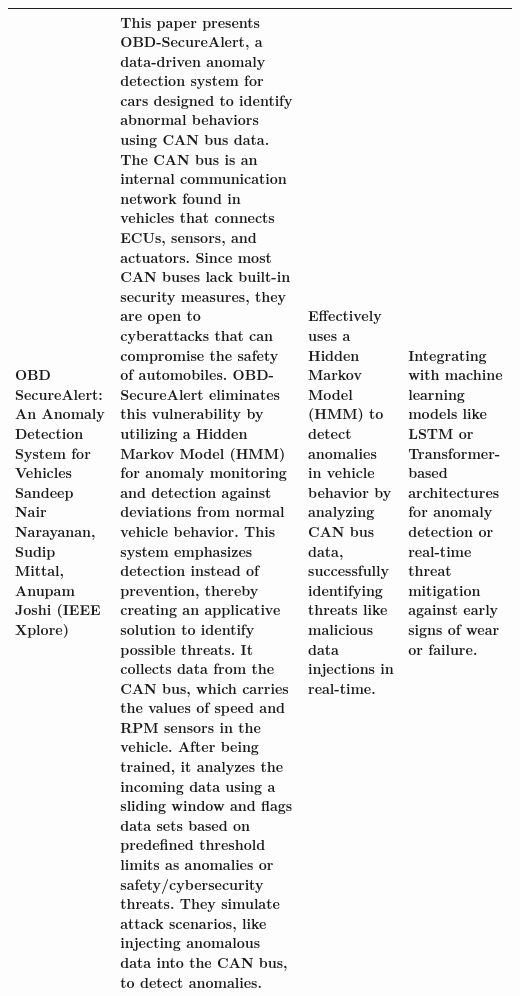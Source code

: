 \begin{longtable}{|p{}|p{}|p{}|p{}|}
OBD SecureAlert: An Anomaly Detection System for Vehicles
\newline
Sandeep Nair Narayanan, Sudip Mittal, Anupam Joshi
\newline
(IEEE Xplore) &
This paper presents OBD-SecureAlert, a data-driven anomaly detection system for cars designed to identify abnormal behaviors using CAN bus data. The CAN bus is an internal communication network found in vehicles that connects ECUs, sensors, and actuators. Since most CAN buses lack built-in security measures, they are open to cyberattacks that can compromise the safety of automobiles.
\newline
OBD-SecureAlert eliminates this vulnerability by utilizing a Hidden Markov Model (HMM) for anomaly monitoring and detection against deviations from normal vehicle behavior. This system emphasizes detection instead of prevention, thereby creating an applicative solution to identify possible threats. It collects data from the CAN bus, which carries the values of speed and RPM sensors in the vehicle. After being trained, it analyzes the incoming data using a sliding window and flags data sets based on predefined threshold limits as anomalies or safety/cybersecurity threats. They simulate attack scenarios, like injecting anomalous data into the CAN bus, to detect anomalies. &
Effectively uses a Hidden Markov Model (HMM) to detect anomalies in vehicle behavior by analyzing CAN bus data, successfully identifying threats like malicious data injections in real-time. &
Integrating with machine learning models like LSTM or Transformer-based architectures for anomaly detection or real-time threat mitigation against early signs of wear or failure. \\
\hline


\end{longtable}

